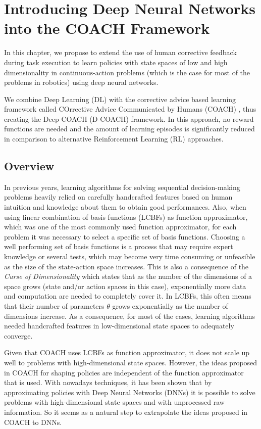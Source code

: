 \chapter{Introducing Deep Neural Networks into the COACH Framework}
In this chapter, we propose to extend the use of human corrective feedback during task execution to learn policies with state spaces of low and high dimensionality in $\text{continuous-action}$ problems (which is the case for most of the problems in robotics) using deep neural networks.

We combine Deep Learning (DL) with the corrective advice based learning framework called COrrective Advice Communicated by Humans (COACH) \cite{Celemin2018AnInteractive}, thus creating the Deep COACH (D-COACH) framework. In this approach, no reward functions are needed and the amount of learning episodes is significantly reduced in comparison to alternative Reinforcement Learning (RL) approaches.

\section{Overview}
In previous years, learning algorithms for solving sequential decision-making problems heavily relied on carefully handcrafted features based on human intuition and knowledge about them to obtain good performances. Also, when using linear combination of basis functions (LCBFs) as function approximator, which was one of the most commonly used function approximator, for each problem it was necessary to select a specific set of basis functions. Choosing a well performing set of basis functions is a process that may require expert knowledge or several tests, which may become very time consuming or unfeasible as the size of the $\text{state-action}$ space increases. This is also a consequence of the \emph{Curse of Dimensionality} \cite{Bellman1957} which states that as the number of the dimensions of a space grows (state and/or action spaces in this case), exponentially more data and computation are needed to completely cover it. In LCBFs, this often means that their number of parameters $\theta$ grows exponentially as the number of dimensions increase. As a consequence, for most of the cases, learning algorithms needed handcrafted features in low-dimensional state spaces to adequately converge.

Given that COACH uses LCBFs as function approximator, it does not scale up well to problems with high-dimensional state spaces. However, the ideas proposed in COACH for shaping policies are independent of the function approximator that is used. With nowadays techniques, it has been shown that by approximating policies with Deep Neural Networks (DNNs) it is possible to solve problems with high-dimensional state spaces and with unprocessed raw information. So it seems as a natural step to extrapolate the ideas proposed in COACH to DNNs. 


